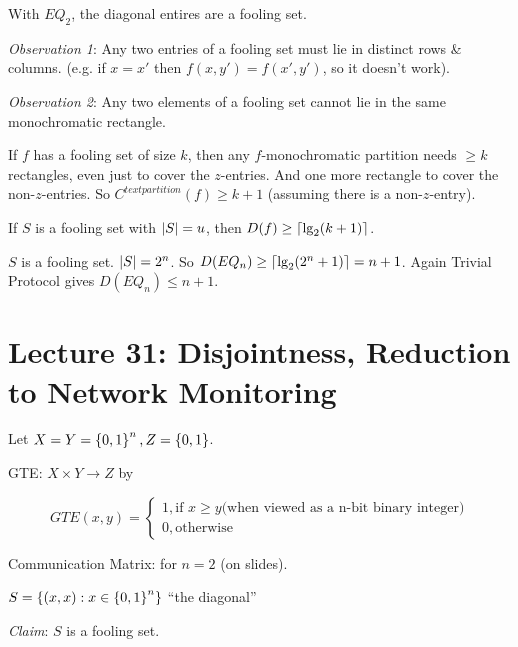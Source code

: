\begin{example}
    With $EQ_2$, the diagonal entires are a fooling set.

    \emph{Observation 1}: Any two entries of a fooling set must lie in distinct rows \& columns. (e.g. if $x = x'$ then $f(x, y') = f(x', y')$, so it doesn't work).

    \emph{Observation 2}: Any two elements of a fooling set cannot lie in the same monochromatic rectangle.
\end{example}

\begin{corollary}
    If $f$ has a fooling set of size $k$, then any $f$-monochromatic partition needs $\geq k$ rectangles, even just to cover the $z$-entries. And one more rectangle to cover the non-$z$-entries. So $C^{text{partition}}(f) \geq k + 1$ (assuming there is a non-$z$-entry).
\end{corollary}

\begin{corollary}
    If $S$ is a fooling set with $\left | S \right | = u$, then $D(f) \geq \left \lceil \lg_2(k + 1) \right \rceil$.
\end{corollary}

$S$ is a fooling set. $\left | S \right | = 2^n$. So $D(EQ_n) \geq \left \lceil \lg_2(2^n + 1) \right \rceil = n + 1$. Again Trivial Protocol gives $D(EQ_n) \leq n + 1$.

\section*{Lecture 31: Disjointness, Reduction to Network Monitoring}

Let $X = Y = \left \{ 0, 1 \right \}^n, Z = \left \{ 0, 1 \right \}$.

\begin{definition}
    GTE: $X \times Y \rightarrow Z$ by

    \begin{dmath*}
        GTE(x, y) = \begin{cases}
            1, \text{if } x \geq y \text{(when viewed as a n-bit binary integer)} \\
            0, \text{otherwise}
        \end{cases}
    \end{dmath*}
\end{definition}

Communication Matrix: for $n = 2$ (on slides).

$S = \left \{ (x, x): x \in \left \{ 0, 1 \right \}^n \right \}$ ``the diagonal''

\emph{Claim}: $S$ is a fooling set.

